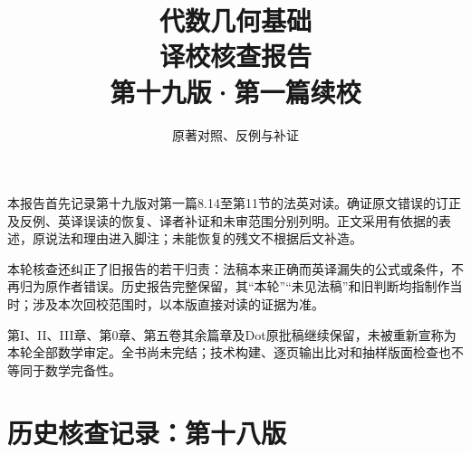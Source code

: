 
\newcommand{\RR}{\mathcal R}
\newcommand{\FF}{\mathcal F}
\newcommand{\GG}{\mathcal G}
\newcommand{\MM}{\mathcal M}
\newcommand{\JJ}{\mathcal J}
\newcommand{\oldauditsrc}[1]{\par\noindent\textbf{原文位置：}#1。\par}
\newcommand{\kind}[2]{\noindent\textbf{分类：#1。}\ #2\par}
\newcommand{\lead}[1]{\par\noindent\textbf{#1}\quad}
\newenvironment{analysisproof}{\par\noindent\textbf{该轮核查的反例或补证。}\ }{\par}

\title{代数几何基础\\译校核查报告\\[1em]\large 第十九版·第一篇续校}
\author{原著对照、反例与补证}
\date{}

\frontmatter
\maketitle
{}
本报告首先记录第十九版对第一篇8.14至第11节的法英对读。确证原文错误的订正及反例、英译误读的恢复、译者补证和未审范围分别列明。正文采用有依据的表述，原说法和理由进入脚注；未能恢复的残文不根据后文补造。

本轮核查还纠正了旧报告的若干归责：法稿本来正确而英译漏失的公式或条件，不再归为原作者错误。历史报告完整保留，其“本轮”“未见法稿”和旧判断均指制作当时；涉及本次回校范围时，以本版直接对读的证据为准。

第I、II、III章、第0章、第五卷其余篇章及Dot原批稿继续保留，未被重新宣称为本轮全部数学审定。全书尚未完结；技术构建、逐页输出比对和抽样版面检查也不等同于数学完备性。

\tableofcontents
\mainmatter





\setcounter{secnumdepth}{-2}
\part{历史核查记录：第十八版}
\setcounter{secnumdepth}{2}




\setcounter{secnumdepth}{-2}
